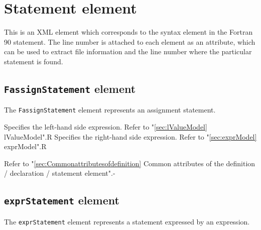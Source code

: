\section{Statement element}

This is an XML element which corresponds to the syntax element in the Fortran 90 statement.
The line number is attached to each element as an attribute, which can be used to extract file information and the line number where the particular statement is found.

\subsection{ {\tt FassignStatement} element}

The {\tt FassignStatement} element represents an assignment statement.


\begin{XcodeMLChildElements}
{Specifies the left-hand side expression. Refer to "\ref{sec:lValueModel} lValueModel".}{R}
{Specifies the right-hand side expression. Refer to "\ref{sec:exprModel} exprModel".}{R}
\end{XcodeMLChildElements}

\begin{XcodeMLAttributes}
{Refer to "\ref{sec:Commonattributesofdefinition} Common attributes of the definition / declaration / statement element".}{-}
\end{XcodeMLAttributes}


\subsection{ {\tt exprStatement} element}

The {\tt exprStatement} element represents a statement expressed by an expression.


